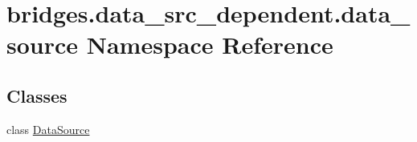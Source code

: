 \hypertarget{namespacebridges_1_1data__src__dependent_1_1data__source}{}\section{bridges.\+data\+\_\+src\+\_\+dependent.\+data\+\_\+source Namespace Reference}
\label{namespacebridges_1_1data__src__dependent_1_1data__source}
\subsection*{Classes}
\begin{DoxyCompactItemize}
\item 
class \mbox{\hyperlink{classbridges_1_1data__src__dependent_1_1data__source_1_1_data_source}{Data\+Source}}
\end{DoxyCompactItemize}
